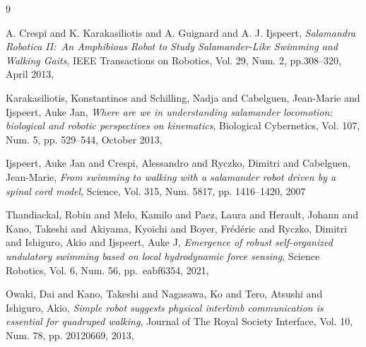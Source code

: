 \documentclass{cmc}
\begin{document}

% 

\begin{thebibliography}{9}

  A. Crespi and K. Karakasiliotis and A. Guignard and A. J. Ijspeert,
  \emph{Salamandra Robotica II:\ An Amphibious Robot to Study Salamander-Like Swimming and Walking Gaits},
  IEEE Transactions on Robotics, Vol. 29, Num. 2, pp.308--320, April 2013,

  Karakasiliotis, Konstantinos and Schilling, Nadja and Cabelguen, Jean-Marie and Ijspeert, Auke Jan,
  \emph{Where are we in understanding salamander locomotion: biological and robotic perspectives on kinematics},
  Biological Cybernetics, Vol. 107, Num. 5, pp. 529--544, October 2013,

  Ijspeert, Auke Jan and Crespi, Alessandro and Ryczko, Dimitri and Cabelguen, Jean-Marie,
  \emph{From swimming to walking with a salamander robot driven by a spinal cord model},
  Science, Vol. 315, Num. 5817, pp. 1416--1420, 2007

  Thandiackal, Robin and Melo, Kamilo and Paez, Laura and Herault, Johann and Kano, Takeshi and Akiyama, Kyoichi and Boyer, Fr{\'e}d{\'e}ric and Ryczko, Dimitri and Ishiguro, Akio and Ijspeert, Auke J,
  \emph{Emergence of robust self-organized undulatory swimming based on local hydrodynamic force sensing},
  Science Robotics, Vol. 6, Num. 56, pp.\ eabf6354, 2021,

  Owaki, Dai and Kano, Takeshi and Nagasawa, Ko and Tero, Atsushi and Ishiguro, Akio,
  \emph{Simple robot suggests physical interlimb communication is essential for quadruped walking},
  Journal of The Royal Society Interface, Vol. 10, Num. 78, pp. 20120669, 2013,

\end{thebibliography}


\end{document}
